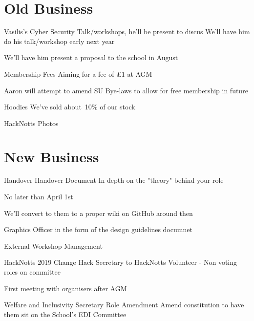 \documentclass[11pt,hacksoc]{meetingmins}
\begin{document}
\section{Old Business}
\begin{items}
	\item
	Vasilis's Cyber Security Talk/workshops, he'll be present to discus
		\subitem
		We'll have him do his talk/workshop early next year
		
		\subitem
		We'll have him present a proposal to the school in August
	
	\item
	Membership Fees
		\subitem
		Aiming for a fee of \pounds1 at AGM
		
		\subitem
		Aaron will attempt to amend SU Bye-laws to allow for free membership in future
		
	\item
	Hoodies
		\subitem
		We've sold about~10\% of our stock
	
	\item
	HackNotts Photos
		\subitem
	
\end{items}

\section{New Business}
\begin{items}
	
	\item
	Handover
		\subitem
		Handover Document
			\subsubitem
			In depth on the "theory" behind your role
			
			\subsubitem
			No later than April 1st
			
			\subsubitem
			We'll convert to them to a proper wiki on GitHub around then
			
			\subsubitem
			Graphics Officer in the form of the design guidelines documnet
	
	\item
	External Workshop Management
		\subitem
	
	\item
	HackNotts 2019
		\subitem
		Change Hack Secretary to HackNotts Volunteer - Non voting roles on committee
		
		\subitem
		First meeting with organisers after AGM
	
	\item
	Welfare and Inclusivity Secretary Role Amendment
		\subitem
		Amend constitution to have them sit on the School's EDI Committee
	
\end{items}

\vspace{1em}
\end{document}
